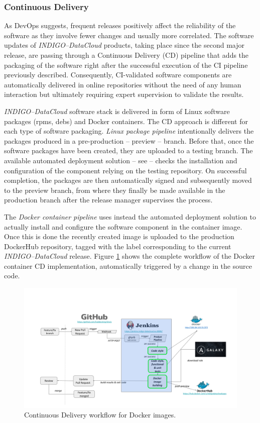 \documentclass[journal]{IEEEtran}
\begin{document}
\subsubsection{Continuous Delivery}
As DevOps suggests, frequent releases positively affect the reliability of the software as
they involve fewer changes and usually more correlated. The software updates of 
{\sl INDIGO--DataCloud} products, taking place since the second major release, are passing through
a Continuous Delivery (CD) pipeline that adds the packaging of the software right after the
successful execution of the CI pipeline previously described. Consequently, CI-validated 
software components are automatically delivered in online repositories without the need of 
any human interaction but ultimately requiring expert supervision to validate the results.

{\sl INDIGO--DataCloud} software stack is delivered in form of Linux software packages (rpms, debs) 
and Docker containers. The CD approach is different for each type of software packaging. \textit{Linux
package pipeline} intentionally delivers the packages produced in a pre-production -- preview --
branch. Before that, once the software packages have been created, they are uploaded to a 
testing branch. The available automated deployment solution -- see \cite{subsec:sqa} -- checks
the installation and configuration of the component relying on the testing repository. On 
successful completion, the packages are then automatically signed and subsequently moved to 
the preview branch, from where they finally be made available in the production branch after
the release manager supervises the process. 

The \textit{Docker container pipeline} uses instead the automated deployment solution to 
actually install and configure the software component in the container image. Once this is 
done the recently created image is uploaded to the production DockerHub repository, tagged
with the label corresponding to the current {\sl INDIGO--DataCloud} release. Figure 
\ref{fig:fig_CD} shows the complete workflow of the Docker container CD implementation, 
automatically triggered by a change in the source code.

\begin{figure}[ht]
\centering
\includegraphics[width=\textwidth]{images/devops.png}
\caption{Continuous Delivery workflow for Docker images.}
\label{fig:fig_CD}
\end{figure}
\end{document}
